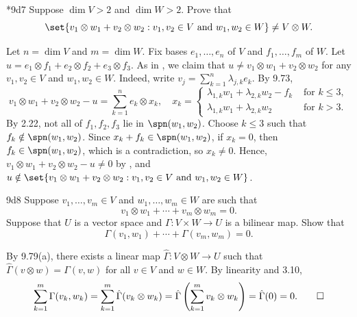 \begin{exercise}*{9d7}
    Suppose $\dim V > 2$ and $\dim W > 2$.
    Prove that
    \[
        \set{v_1 \otimes w_1 + v_2 \otimes w_2 : v_1, v_2 \in V \text{ and } w_1, w_2 \in W} \neq V \otimes W.
    \]
\end{exercise}

\begin{sol}
    Let $n = \dim V$ and $m = \dim W$.
    Fix bases $e_1, \ldots, e_n$ of $V$ and $f_1, \ldots, f_m$ of $W$.
    Let $u = e_1 \otimes f_1 + e_2 \otimes f_2 + e_3 \otimes f_3$.
    As in , we claim that $u \neq v_1 \otimes w_1 + v_2 \otimes w_2$ for any $v_1, v_2 \in V$ and $w_1, w_2 \in W$.
    Indeed, write $v_j = \sum_{k=1}^n \lambda_{j,k} e_k$.
    By 9.73,
    \[
        v_1 \otimes w_1 + v_2 \otimes w_2 - u = \sum_{k=1}^n e_k \otimes x_k, \quad x_k = 
        \begin{cases}
            \lambda_{1,k} w_1 + \lambda_{2,k} w_2 - f_k & \text{ for $k \leq 3$}, \\
            \lambda_{1,k} w_1 + \lambda_{2,k} w_2 & \text{ for $k > 3$}.
        \end{cases}
    \]
    By 2.22, not all of $f_1, f_2, f_3$ lie in $\spn(w_1, w_2)$.
    Choose $k \leq 3$ such that $f_k \notin \spn(w_1, w_2)$.
    Since $x_k + f_k \in \spn(w_1, w_2)$, if $x_k = 0$, then $f_k \in \spn(w_1, w_2)$, which is a contradiction, so $x_k \neq 0$.
    Hence, $v_1 \otimes w_1 + v_2 \otimes w_2 - u \neq 0$ by , and $u \notin \set{v_1 \otimes w_1 + v_2 \otimes w_2 : v_1, v_2 \in V \text{ and } w_1, w_2 \in W}$.
\end{sol}

\begin{exercise}{9d8}
    Suppose $v_1, \ldots, v_m \in V$ and $w_1, \ldots, w_m \in W$ are such that
    \[
        v_1 \otimes w_1 + \cdots + v_m \otimes w_m = 0.
    \]
    Suppose that $U$ is a vector space and $\Gamma \colon V \times W \to U$ is a bilinear map.
    Show that
    \[
        \Gamma(v_1, w_1) + \cdots + \Gamma(v_m, w_m) = 0.
    \]
\end{exercise}

\begin{sol}
    By 9.79(a), there exists a linear map $\hat \Gamma \colon V \otimes W \to U$ such that $\hat \Gamma(v \otimes w) = \Gamma(v, w)$ for all $v \in V$ and $w \in W$.
    By linearity and 3.10,
    \[
        \sum_{k=1}^m \Gamma(v_k, w_k) = \sum_{k=1}^m \hat \Gamma(v_k \otimes w_k) = \hat \Gamma \left(\sum_{k=1}^m v_k \otimes w_k\right) = \hat \Gamma(0) = 0. \qedhere
    \]
\end{sol}

